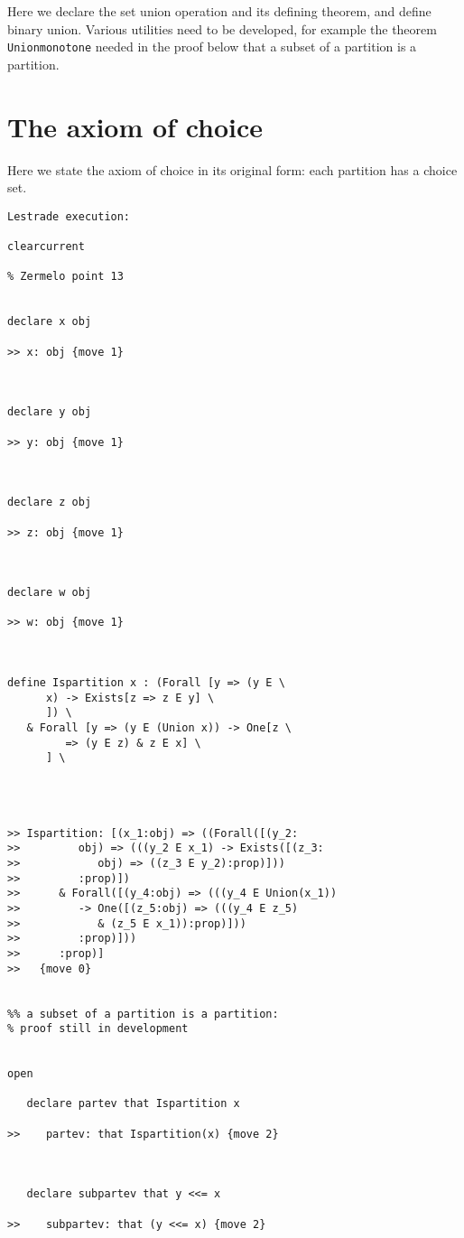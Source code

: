 \documentclass[12pt]{article}
\begin{document}
Here we declare the set union operation and its defining theorem, and define binary union.  Various utilities need to be developed, for example the theorem
{\tt Unionmonotone} needed in the proof below that a subset of a partition is a partition.

\section{The axiom of choice}

Here we state the axiom of choice in its original form:  each partition has a choice set.

\begin{verbatim}Lestrade execution:

clearcurrent

% Zermelo point 13


declare x obj

>> x: obj {move 1}



declare y obj

>> y: obj {move 1}



declare z obj

>> z: obj {move 1}



declare w obj

>> w: obj {move 1}



define Ispartition x : (Forall [y => (y E \
      x) -> Exists[z => z E y] \
      ]) \
   & Forall [y => (y E (Union x)) -> One[z \
         => (y E z) & z E x] \
      ] \
   



>> Ispartition: [(x_1:obj) => ((Forall([(y_2:
>>         obj) => (((y_2 E x_1) -> Exists([(z_3:
>>            obj) => ((z_3 E y_2):prop)]))
>>         :prop)])
>>      & Forall([(y_4:obj) => (((y_4 E Union(x_1))
>>         -> One([(z_5:obj) => (((y_4 E z_5)
>>            & (z_5 E x_1)):prop)]))
>>         :prop)]))
>>      :prop)]
>>   {move 0}


%% a subset of a partition is a partition:
% proof still in development


open

   declare partev that Ispartition x

>>    partev: that Ispartition(x) {move 2}



   declare subpartev that y <<= x

>>    subpartev: that (y <<= x) {move 2}




\end{verbatim}
\end{document}
